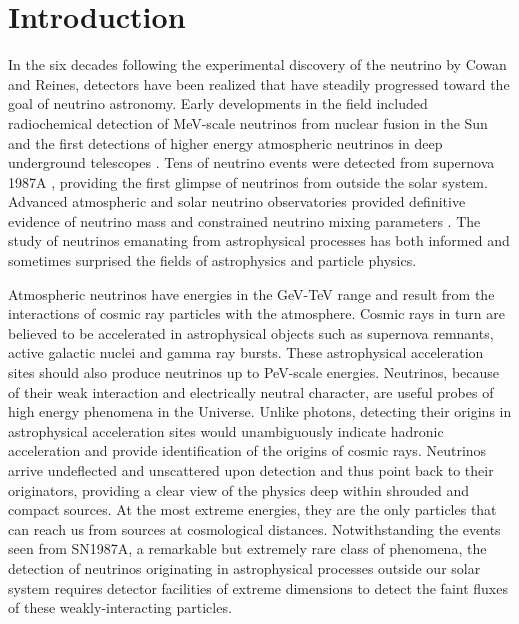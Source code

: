 
\section{Introduction}
\label{sec:intro}

In the six decades following the experimental
discovery of the neutrino by Cowan and Reines, detectors have been realized
that have steadily progressed toward the goal of neutrino
astronomy.  Early developments in the field included 
radiochemical detection of MeV-scale neutrinos from
nuclear fusion in the Sun \cite{Homestake} and the first detections of
higher energy
atmospheric neutrinos in deep underground telescopes
\cite{Achar,Witwatersrand}. Tens of neutrino
events were detected from supernova 1987A
\cite{SK1987A,IMB1987A,BUST1987A}, providing the first glimpse of neutrinos
from outside the solar system.  Advanced
atmospheric and solar neutrino observatories provided definitive
evidence of neutrino mass and constrained neutrino mixing
parameters \cite{SK,SNO}. The study of neutrinos emanating from astrophysical
processes has both informed and sometimes surprised the fields of
astrophysics and particle physics. 

Atmospheric neutrinos have energies in the GeV-TeV range and result from the interactions of cosmic ray
particles with the atmosphere. Cosmic rays in turn are
believed to be accelerated in astrophysical objects such as supernova
remnants, active galactic nuclei and gamma ray bursts. These
astrophysical acceleration sites should also produce neutrinos up to 
PeV-scale energies. Neutrinos, because of their weak interaction and electrically neutral character, are useful probes of high
energy phenomena in the Universe. Unlike photons, detecting their origins in astrophysical
acceleration sites would unambiguously indicate hadronic acceleration and
provide identification of the origins of cosmic rays. Neutrinos arrive 
undeflected and unscattered upon detection and thus point back to their
originators, providing
a clear view of the physics deep within shrouded and compact sources. At
the most extreme energies, they are the only particles that can reach 
us from sources at cosmological distances. Notwithstanding the events seen from SN1987A, a remarkable but
extremely rare class of phenomena, the detection of neutrinos originating in
astrophysical processes outside our solar system requires detector facilities of
extreme dimensions to detect the faint fluxes of these weakly-interacting
particles. 

